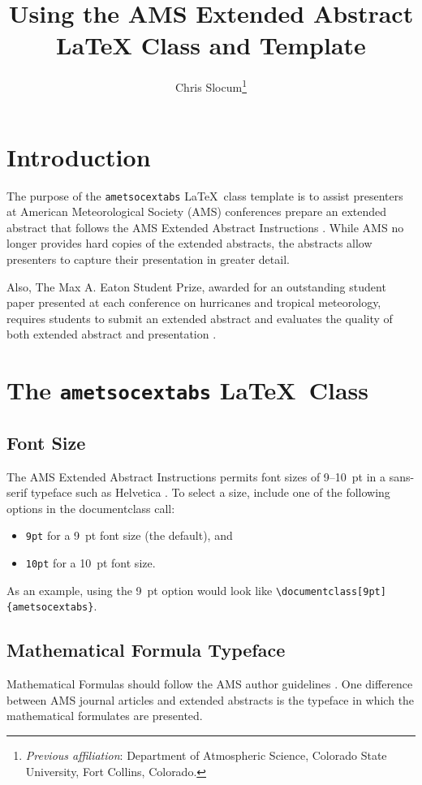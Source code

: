 \documentclass[9pt]{ametsocextabs}
\title{Using the AMS Extended Abstract LaTeX Class and Template}
\author{Chris Slocum\aff{a}\thanks{\textit{Previous affiliation}: Department of Atmospheric Science, Colorado State University, Fort Collins, Colorado.}\correspondingauthor{Chris Slocum, \url{https://github.com/CSlocumWX/}}
}
\affiliation{\aff{a}{Fort Collins, Colorado}}
\begin{document}
\maketitle
\section{Introduction}
The purpose of the \lowercase{\texttt{ametsocextabs}} \LaTeX\ class
template is to assist presenters at American Meteorological Society
(AMS) conferences prepare an extended abstract that follows the AMS
Extended Abstract Instructions \citep{AMS2025abs}. While AMS no
longer provides hard copies of the extended abstracts, the abstracts
allow presenters to capture their presentation in greater detail.

Also, The Max A. Eaton Student Prize, awarded for an outstanding
student paper presented at each conference on hurricanes and tropical
meteorology, requires students to submit an extended abstract and
evaluates the quality of both extended abstract and presentation
\citep{AMS2025student, AMS2025Eaton}.

\section{The \lowercase{\texttt{ametsocextabs}} \LaTeX\ Class}

\subsection{Font Size}

The AMS Extended Abstract Instructions permits font sizes of 9--10~pt
in a sans-serif typeface such as Helvetica \citep{AMS2025abs}.
To select a size, include one of the following options in the
documentclass call:
\begin{itemize}
    \item \texttt{9pt} for a 9~pt font size (the default), and
    \item \texttt{10pt} for a 10~pt font size.
\end{itemize}
As an example, using the 9~pt option would look like
\texttt{\textbackslash documentclass[9pt]\{ametsocextabs\}}.

\subsection{Mathematical Formula Typeface}
Mathematical Formulas should follow the AMS author guidelines
\citep{AMS2025math}. One difference between AMS journal articles
and extended abstracts is the typeface in which the mathematical
formulates are presented.
\end{document}
